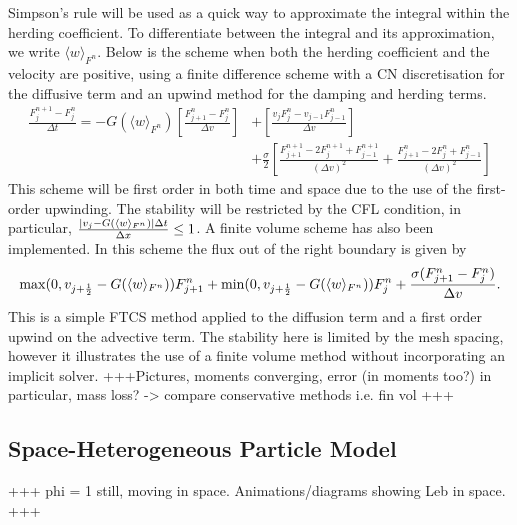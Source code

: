     Simpson's rule will be used as a quick way to approximate the integral within the herding coefficient. To differentiate between the integral and its approximation, we write \(\langle w\rangle_{F^n}\). Below is the scheme when both the herding coefficient and the velocity are positive, using a finite difference scheme with a CN discretisation for the diffusive term and an upwind method for the damping and herding terms.
    \begin{equation*}
    \begin{split}
    \frac{F_j^{n+1} - F_j^n}{\Delta t} = 	-G(\langle w\rangle_{F^n})\left[ \frac{F^n_{j+1} - F^n_{j}}{\Delta v}\right] &+\left[ \frac{v_{j}F^n_{j} - v_{j-1}F^n_{j-1}}{\Delta v}\right]\\ &+ \frac{\sigma}{2}\left[ \frac{F^{n+1}_{j+1} - 2F^{n+1}_j + F^{n+1}_{j-1}}{(\Delta v)^2} + \frac{F^{n}_{j+1} - 2F^{n}_j + F^{n}_{j-1}}{(\Delta v)^2}\right] 	 
    \end{split}
    \end{equation*}
    This scheme will be first order in both time and space due to the use of the first-order upwinding. The stability will be restricted by the CFL condition, in particular, $\frac{|v_j-G(\langle w\rangle_{F^n})|\Delta t}{\Delta x} \leq 1$. A finite volume scheme has also been implemented. In this scheme the flux out of the right boundary is given by 
     \[ \max(0, v_{j+\frac{1}{2}}-G(\langle w\rangle_{F^n}))F^n_{j+1} + \min(0, v_{j+\frac{1}{2}}-G(\langle w\rangle_{F^n}))F^n_j + \frac{\sigma(F^n_{j+1} - F^n_j)}{\Delta v}.
     \]
     This is a simple FTCS method applied to the diffusion term and a first order upwind on the advective term. The stability here is limited by the mesh spacing, however it illustrates the use of a finite volume method without incorporating an implicit solver.
    +++Pictures, moments converging, error (in moments too?) in particular, mass loss? -> compare conservative methods i.e. fin vol +++
\subsection{Space-Heterogeneous Particle Model}\label{sec:hetkin}
    +++ phi = 1 still, moving in space. Animations/diagrams showing Leb in space. +++
    